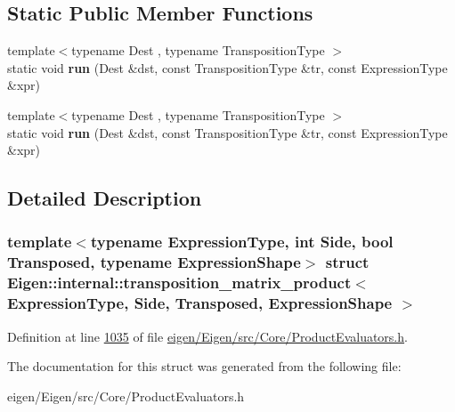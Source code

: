 \subsection*{Static Public Member Functions}
\begin{DoxyCompactItemize}
\item 
\mbox{\label{struct_eigen_1_1internal_1_1transposition__matrix__product_a35b39d1ac053d48b58de279b9256823c}} 
{\footnotesize template$<$typename Dest , typename Transposition\+Type $>$ }\\static void {\bfseries run} (Dest \&dst, const Transposition\+Type \&tr, const Expression\+Type \&xpr)
\item 
\mbox{\label{struct_eigen_1_1internal_1_1transposition__matrix__product_a35b39d1ac053d48b58de279b9256823c}} 
{\footnotesize template$<$typename Dest , typename Transposition\+Type $>$ }\\static void {\bfseries run} (Dest \&dst, const Transposition\+Type \&tr, const Expression\+Type \&xpr)
\end{DoxyCompactItemize}


\subsection{Detailed Description}
\subsubsection*{template$<$typename Expression\+Type, int Side, bool Transposed, typename Expression\+Shape$>$\newline
struct Eigen\+::internal\+::transposition\+\_\+matrix\+\_\+product$<$ Expression\+Type, Side, Transposed, Expression\+Shape $>$}



Definition at line \hyperlink{eigen_2_eigen_2src_2_core_2_product_evaluators_8h_source_l01035}{1035} of file \hyperlink{eigen_2_eigen_2src_2_core_2_product_evaluators_8h_source}{eigen/\+Eigen/src/\+Core/\+Product\+Evaluators.\+h}.



The documentation for this struct was generated from the following file\+:\begin{DoxyCompactItemize}
\item 
eigen/\+Eigen/src/\+Core/\+Product\+Evaluators.\+h\end{DoxyCompactItemize}
